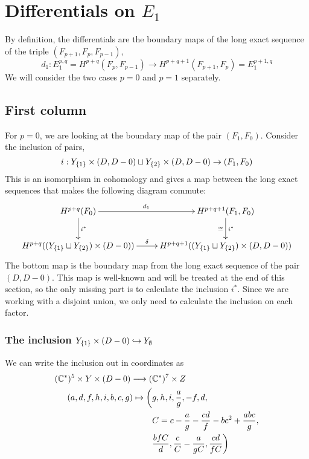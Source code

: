 \section{Differentials on $E_1$}
\label{sec:orientation}

By definition, the differentials are the boundary maps of the long
exact sequence of the triple $(F_{p+1},F_p,F_{p-1})$,
\[ d_1 : E_1^{p,q} = H^{p+q}(F_p,F_{p-1}) \to H^{p+q+1}(F_{p+1},F_p) =
E_1^{p+1,q} \]
We will consider the two cases $p=0$ and $p=1$ separately.

\subsection{First column}

For $p = 0$, we are looking at the boundary map of the pair
$(F_1,F_0)$. Consider the inclusion of pairs,
\[ i : Y_{\left\{ 1 \right\}}\times (D,D-0) \sqcup Y_{\left\{ 2 \right\}}\times (D,D-0) \to
(F_1,F_0) \]
This is an isomorphism in cohomology and gives a map between the long
exact sequences that makes the following diagram
commute:
\[ \xymatrix{
H^{p+q}(F_0) \ar[r]^>>>>>>>>>>>>>>>>>>>>{d_1} \ar[d]^{i^*} &
H^{p+q+1}(F_1,F_0) \ar[d]^{i^*}_{\cong} \\
H^{p+q}((Y_{\set{1}}\sqcup Y_{\set{2}})\times (D-0))
\ar[r]^>>>>>{\delta} & H^{p+q+1}((Y_{\set{1}}\sqcup Y_{\set{2}})\times
(D,D-0)) } \]
The bottom map is the boundary map from the long exact sequence of the
pair $(D,D-0)$. This map is well-known and will be treated at the end
of this section, so the only missing part is to calculate the
inclusion $i^*$. Since we are working with a disjoint union, we only
need to calculate the inclusion on each factor.

\subsubsection{The inclusion $Y_{\left\{ 1 \right\}}\times (D-0) 
  \hookrightarrow Y_\emptyset$}

We can write the inclusion out in coordinates as
\begin{align*}
  (\mathbb{C}^*)^5\times Y \times (D-0) \longrightarrow
  (&\mathbb{C}^*)^7\times Z \\
  (a,d,f,h,i,b,c,g) \mapsto \bigg(&g,h,i,\frac{a}{g},-f,d,\\
  & C =
  c-\frac{a}{g}-\frac{cd}{f}-bc^2+\frac{abc}{g}, \\
  & \frac{bfC}{d},\frac{c}{C}-\frac{a}{g C},\frac{cd}{fC}\bigg) 
\end{align*}

